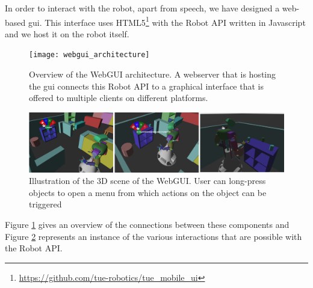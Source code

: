 \label{ssec:webgui}
In order to interact with the robot, apart from speech, we have designed a web-based \gls{gui}. This interface uses HTML5\footnote{\url{https://github.com/tue-robotics/tue_mobile_ui}} with the Robot API written in Javascript and we host it on the robot itself.
\begin{figure}[h]
    \centering
	\texttt{[image: webgui\_architecture]}
	\caption{
		Overview of the WebGUI architecture.
		A webserver that is hosting the \protect\gls{gui} connects this Robot API to a graphical interface that is offered to multiple clients on different platforms.}
	\label{fig:webgui_architecture}
\end{figure}

\begin{figure}[H]
	\includegraphics[width=\linewidth]{Figures/gui_actions}
	\caption{
		Illustration of the 3D scene of the WebGUI.
		User can long-press objects to open a menu from which actions on the object can be triggered
		}
	\label{fig:gui_actions}

\end{figure}
Figure \ref{fig:webgui_architecture} gives an overview of the connections between these components and Figure \ref{fig:gui_actions} represents an instance of the various interactions that are possible with the Robot API.
